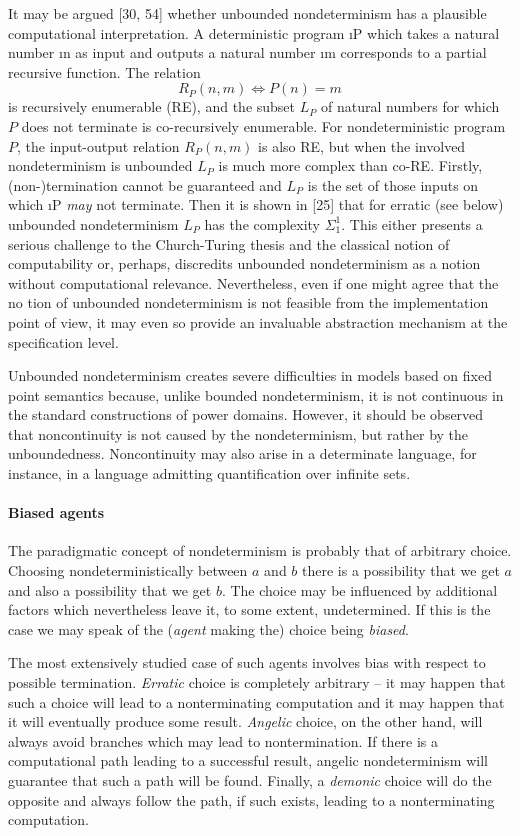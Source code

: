 \documentclass[10pt]{article}
\renewcommand{\iff}{\mathrel{\Leftrightarrow}}
\begin{document}
It may be argued [30, 54] 
whether unbounded nondeterminism has a plausible computational 
interpretation. A deterministic program {\i P} which takes a natural 
number {\i n} as input and outputs a natural number {\i m}
 corresponds to a partial recursive function. The relation 
 \[
  R_{P}(n,m) \iff P(n)=m
  \] 
\noindent 
is recursively enumerable (RE), and 
the subset $L_{P}$ of natural numbers for which $P$ 
does not terminate is co-recursively enumerable. For nondeterministic 
program $P$, the input-output relation $R_{P}(n,m)$ is also RE, but when the involved 
nondeterminism is unbounded $L_{P}$ is much more 
complex than co-RE. Firstly, (non-)termination cannot be guaranteed 
and $L_{P}$ is the set of those inputs on which 
{\i P} {\em may} not terminate. Then it is shown in [25] that for 
erratic (see below) unbounded nondeterminism $L_{P}$ has the 
complexity $\Sigma_{1}^{1}$.
 This either presents a serious challenge to the Church-Turing 
thesis and the classical notion of computability or, perhaps, 
discredits unbounded nondeterminism as a notion without computational 
relevance. Nevertheless, even if one might agree that the no
tion of unbounded nondeterminism is not feasible from the 
implementation point of view, it may even so provide an invaluable 
abstraction mechanism at the specification level.
 
Unbounded nondeterminism creates severe difficulties in models based 
on fixed point semantics because, unlike bounded nondeterminism, it 
is not continuous in the standard constructions of power domains. 
However, it should be observed that noncontinuity is 
not caused by the nondeterminism, but rather by the unboundedness. 
Noncontinuity may also arise in a determinate language, for instance, 
in a language admitting quanti\-fication over infinite sets. 

\paragraph*{Biased agents }
 The paradigmatic concept of 
nondeterminism is probably that of arbitrary choice. Choosing 
nondeterministically between $a$ and $b$ there is a possibility 
that we get $a$ and also a possibility that we get $b$. 
The choice may be influenced by additional factors which 
never\-theless leave it, to some extent, undetermined. If this is the 
case we may speak of the ({\em agent} making the) choice being {\em 
biased}. 

The most extensively studied 
case of such agents involves bias with respect to possible 
termination. {\em Erratic} choice is completely arbitrary -- 
 it may happen that such a choice will lead to a nonterminating 
computation and it may happen that it will eventually produce some 
result. {\em Angelic}
 choice, on the other hand, will always avoid branches which may lead 
to nontermination. If there is a computational path leading to a 
successful result, angelic nondeterminism will guarantee that such a 
path will be found. Finally, a {\em demonic}
 choice will do the opposite and always follow the path, if such 
exists, leading to a nonterminating computation.
\end{document}
